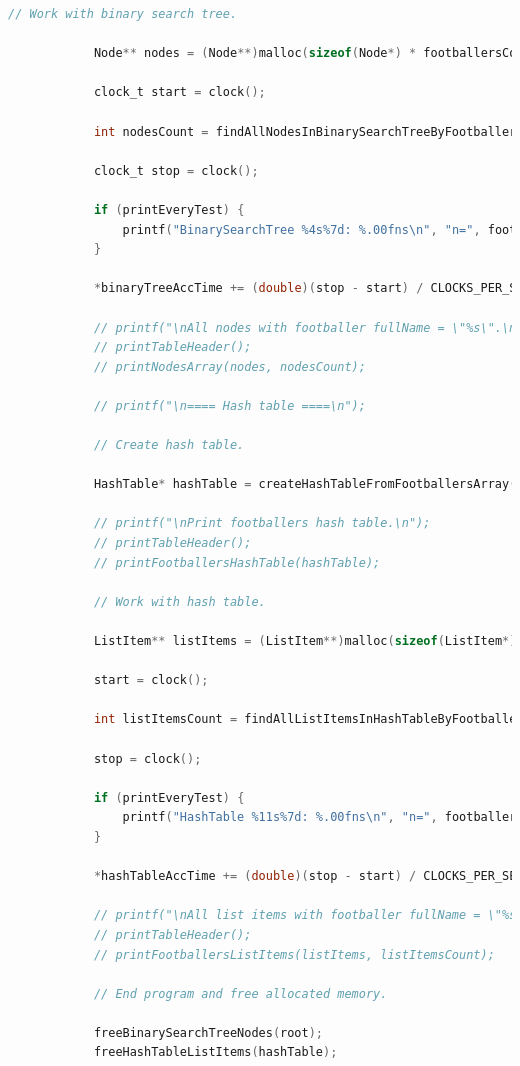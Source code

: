 \documentclass[12pt]{article}
\begin{document}
\begin{lstlisting}[language=C]
			// Work with binary search tree.
			
			Node** nodes = (Node**)malloc(sizeof(Node*) * footballersCount);
			
			clock_t start = clock();
			
			int nodesCount = findAllNodesInBinarySearchTreeByFootballerFullName(root, fullName, nodes);
			
			clock_t stop = clock();
			
			if (printEveryTest) {
				printf("BinarySearchTree %4s%7d: %.00fns\n", "n=", footballersCount, (double)(stop - start) / CLOCKS_PER_SEC * TIME);
			}
			
			*binaryTreeAccTime += (double)(stop - start) / CLOCKS_PER_SEC * TIME;
			
			// printf("\nAll nodes with footballer fullName = \"%s\".\n", fullName);
			// printTableHeader();
			// printNodesArray(nodes, nodesCount);
			
			// printf("\n==== Hash table ====\n");
			
			// Create hash table.
			
			HashTable* hashTable = createHashTableFromFootballersArray(footballers, footballersCount);
			
			// printf("\nPrint footballers hash table.\n");
			// printTableHeader();
			// printFootballersHashTable(hashTable);
			
			// Work with hash table.
			
			ListItem** listItems = (ListItem**)malloc(sizeof(ListItem*) * footballersCount);
			
			start = clock();
			
			int listItemsCount = findAllListItemsInHashTableByFootballerFullName(hashTable, fullName, listItems);
			
			stop = clock();
			
			if (printEveryTest) {
				printf("HashTable %11s%7d: %.00fns\n", "n=", footballersCount, (double)(stop - start) / CLOCKS_PER_SEC * TIME);
			}
			
			*hashTableAccTime += (double)(stop - start) / CLOCKS_PER_SEC * TIME;
			
			// printf("\nAll list items with footballer fullName = \"%s\".\n", fullName);
			// printTableHeader();
			// printFootballersListItems(listItems, listItemsCount);
			
			// End program and free allocated memory.
			
			freeBinarySearchTreeNodes(root);
			freeHashTableListItems(hashTable);
			

\end{lstlisting}
\end{document}
